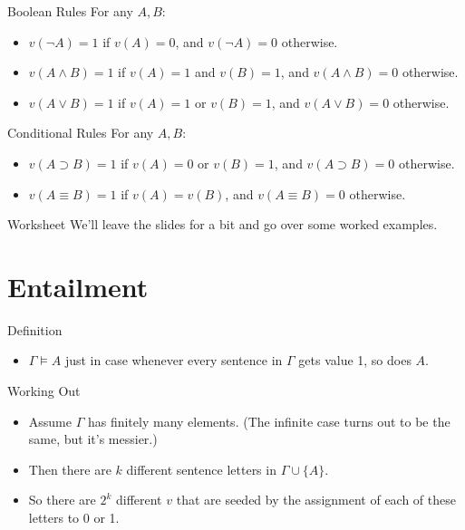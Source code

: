 \documentclass[
  17pt,
  letterpaper,
  ignorenonframetext,
  aspectratio=169,
  handout]{beamer}
\providecommand{\tightlist}{%
  \setlength{\itemsep}{0pt}\setlength{\parskip}{0pt}}\usepackage{longtable,booktabs,array}
\begin{document}
\begin{frame}{Boolean Rules}
\protect\hypertarget{boolean-rules}{}
For any \(A, B\):

\begin{itemize}[<+->]
\tightlist
\item
  \(v(\neg A) = 1\) if \(v(A) = 0\), and \(v(\neg A) = 0\) otherwise.
\item
  \(v(A \wedge B) = 1\) if \(v(A) = 1\) and \(v(B) = 1\), and
  \(v(A \wedge B) = 0\) otherwise.
\item
  \(v(A \vee B) = 1\) if \(v(A) = 1\) or \(v(B) = 1\), and
  \(v(A \vee B) = 0\) otherwise.
\end{itemize}
\end{frame}

\begin{frame}{Conditional Rules}
\protect\hypertarget{conditional-rules}{}
For any \(A, B\):

\begin{itemize}[<+->]
\tightlist
\item
  \(v(A \supset B) = 1\) if \(v(A) = 0\) or \(v(B) = 1\), and
  \(v(A \supset B) = 0\) otherwise.
\item
  \(v(A \equiv B) = 1\) if \(v(A) = v(B)\), and \(v(A \equiv B) = 0\)
  otherwise.
\end{itemize}
\end{frame}

\begin{frame}{Worksheet}
\protect\hypertarget{worksheet}{}
We'll leave the slides for a bit and go over some worked examples.
\end{frame}

\hypertarget{entailment}{%
\section{Entailment}\label{entailment}}

\begin{frame}{Definition}
\protect\hypertarget{definition}{}
\begin{itemize}[<+->]
\tightlist
\item
  \(\Gamma \vDash A\) just in case whenever every sentence in \(\Gamma\)
  gets value 1, so does \(A\).
\end{itemize}
\end{frame}

\begin{frame}{Working Out}
\protect\hypertarget{working-out}{}
\begin{itemize}[<+->]
\tightlist
\item
  Assume \(\Gamma\) has finitely many elements. (The infinite case turns
  out to be the same, but it's messier.)
\item
  Then there are \(k\) different sentence letters in
  \(\Gamma \cup \{A\}\).
\item
  So there are \(2^k\) different \(v\) that are seeded by the assignment
  of each of these letters to 0 or 1.
\end{itemize}
\end{frame}
\end{document}
